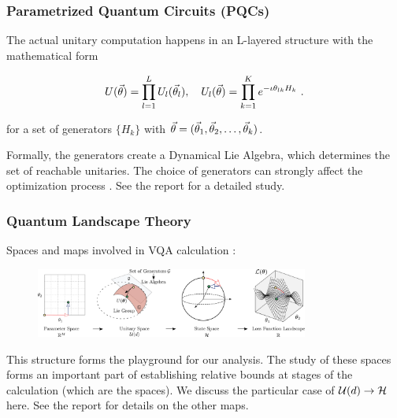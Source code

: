 \begin{frame}
    \frametitle{Parametrized Quantum Circuits (PQCs)}

    The actual unitary computation happens in an L-layered structure with the
    mathematical form

    \begin{gather}
        U(\vec{\theta}) = \prod\limits_{l = 1}^{L} U_l(\vec{\theta}_l), \quad
        U_l(\vec{\theta}) = \prod\limits_{k = 1}^{K} e^{-\iota \theta_{lk} H_k}~.
        \label{eq:pqc}
    \end{gather}

    for a set of generators \(\{H_k\}\) with \(\vec{\theta} = (\vec{\theta}_1,
    \vec{\theta}_2, \ldots, \vec{\theta}_k)\).

    Formally, the generators create a Dynamical Lie Algebra, which determines
    the set of reachable unitaries. The choice of generators can strongly affect
    the optimization process \cite{larocca2021diagnosing}. See the report for a
    detailed study.

\end{frame}

\begin{frame}
    \frametitle{Quantum Landscape Theory}

    Spaces and maps involved in VQA calculation \cite{larocca2021theory}:

    \begin{figure}
        \includegraphics[width=0.8\textwidth]{figures/mapsurjective.pdf}
    \end{figure}

    This structure forms the playground for our analysis. The study of these
    spaces forms an important part of establishing relative bounds at stages of
    the calculation (which are the spaces). We discuss the particular case of
    \(\mathcal{U}(d) \to \mathcal{H}\) here. See the report for details on the
    other maps.

\end{frame}
